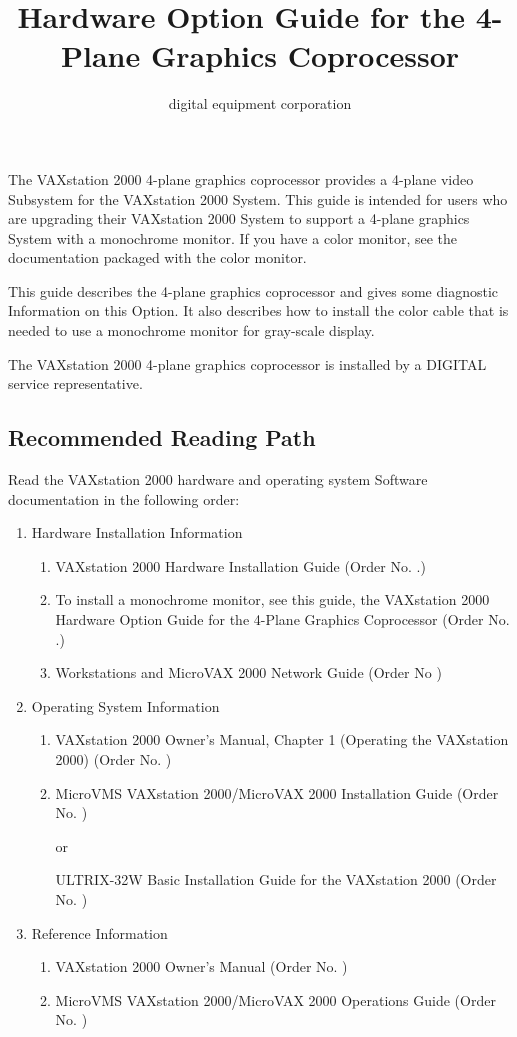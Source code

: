 \documentclass{dec}
\title{Hardware Option Guide for the 4-Plane Graphics Coprocessor}
\author{digital equipment corporation}
\begin{document}
\maketitle

\toc

\newpage
{}
\thispagestyle{preface}
The VAXstation 2000 4-plane graphics coprocessor provides a 4-plane video
Subsystem for the VAXstation 2000 System. This guide is intended for
users who are upgrading their VAXstation 2000 System to support a 4-plane
graphics System with a monochrome monitor. If you have a color monitor,
see the documentation packaged with the color monitor.

This guide describes the 4-plane graphics coprocessor and gives some
diagnostic Information on this Option. It also describes how to install the color
cable that is needed to use a monochrome monitor for gray-scale display.

The VAXstation 2000 4-plane graphics coprocessor is installed by a DIGITAL
service representative.

\subsection*{Recommended Reading Path}
Read the VAXstation 2000 hardware and operating system Software documentation in the following order:
\begin{enumerate}
	\item Hardware Installation Information
	\begin{enumerate}
		\item VAXstation 2000 Hardware Installation Guide (Order No. .)
		\item To install a monochrome monitor, see this guide, the VAXstation 2000 Hardware Option Guide for the 4-Plane Graphics Coprocessor (Order No.  .)
		\item Workstations and MicroVAX 2000 Network Guide (Order No )
	\end{enumerate}
	\item Operating System Information
	\begin{enumerate}
		\item VAXstation 2000 Owner's Manual, Chapter 1 (Operating the VAXstation 2000) (Order No. )
		\item MicroVMS VAXstation 2000/MicroVAX 2000 Installation Guide (Order No. )

				or

				ULTRIX-32W Basic Installation Guide for the VAXstation 2000 (Order No. )
	\end{enumerate}
	\item Reference Information
	\begin{enumerate}
		\item VAXstation 2000 Owner's Manual (Order No. )
		\item MicroVMS VAXstation 2000/MicroVAX 2000 Operations Guide (Order No. )
	\end{enumerate}
\end{enumerate}
\end{document}

